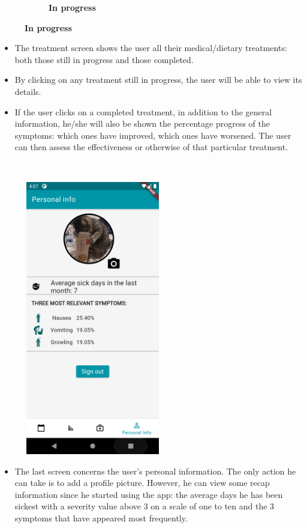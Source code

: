 \documentclass [12pt]{article}
\begin{document}
\begin{description}[leftmargin=1cm,rightmargin=1cm]
\begin{figure}[h!]
\begin{subfigure}[tr]{0.3\linewidth}
\caption{\textbf{In progress}}
\end{subfigure}
\hspace*{\fill}
\end{figure}
\begin{itemize}[•]
\item The treatment screen shows the user all their medical/dietary treatments: both those still in progress and those completed. 
\item By clicking on any treatment still in progress, the user will be able to view its details. 
\item If the user clicks on a completed treatment, in addition to the general information, he/she will also be shown the percentage progress of the symptoms: which ones have improved, which ones have worsened. The user can then assess the effectiveness or otherwise of that particular treatment. 
\end{itemize}
\clearpage

\item [ 7)Personal page]
\
\
\
\begin{figure}[h!]
\centering
\includegraphics[width=6cm,height=12cm]{PersonalPage.PNG}
\end{figure}
\begin{itemize}[•]
\item The last screen concerns the user's personal information. The only action he can take is to add a profile picture. However, he can view some recap information since he started using the app: the average days he has been sickest with a severity value above 3 on a scale of one to ten and the 3 symptoms that have appeared most frequently.
\end{itemize}
\end{description}
\end{document}
